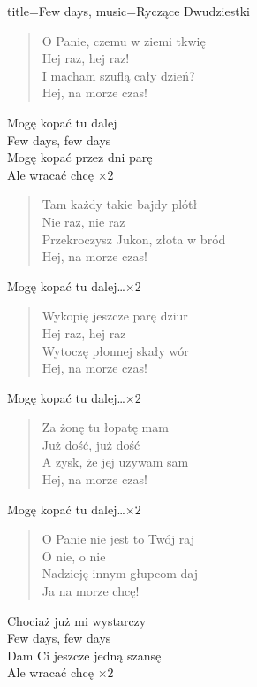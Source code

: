 \newpage
\begin{song}{title={Few days}, music={Ryczące Dwudziestki}}
\begin{multicols}{2}
    \begin{verse}
        O Panie, czemu w ziemi tkwię \\
		Hej raz, hej raz! \\
		I macham szuflą cały dzień? \\
		Hej, na morze czas! 
    \end{verse}
    \begin{chorus}
        Mogę kopać tu dalej \\
		Few days, few days \\
		Mogę kopać przez dni parę \\ 
		Ale wracać chcę  $\times 2$ 
    \end{chorus}
    \begin{verse}
        Tam każdy takie bajdy plótł \\
		Nie raz, nie raz \\
		Przekroczysz Jukon, złota w bród \\
		Hej, na morze czas! 
    \end{verse}
    \begin{chorus}
        Mogę kopać tu dalej\ldots $\times 2$ 
    \end{chorus}
    \begin{verse}
        Wykopię jeszcze parę dziur \\
		Hej raz, hej raz \\
		Wytoczę płonnej skały wór \\
		Hej, na morze czas!
    \end{verse}
    \begin{chorus}
        Mogę kopać tu dalej\ldots $\times 2$ 
    \end{chorus}
    \begin{verse}
        Za żonę tu łopatę mam \\
		Już dość, już dość \\
		A zysk, że jej uzywam sam \\
		Hej, na morze czas!
    \end{verse}
    \begin{chorus}
        Mogę kopać tu dalej\ldots $\times 2$ 
    \end{chorus}
    \begin{verse}
        O Panie nie jest to Twój raj \\
		O nie, o nie \\
		Nadzieję innym głupcom daj \\
		Ja na morze chcę!
    \end{verse}
    \begin{chorus}
        Chociaż już mi wystarczy \\
		Few days, few days \\
		Dam Ci jeszcze jedną szansę \\
		Ale wracać chcę $\times 2$ 
    \end{chorus}
\end{multicols}
\end{song}

